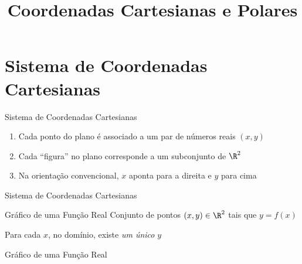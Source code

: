 
\usepackage{calculo_varias_variaveis-1}

\usepackage{tikz}
\usetikzlibrary{angles}

\title {Coordenadas Cartesianas e Polares}



\addtitle

\section{Sistema de Coordenadas Cartesianas}

\begin{frame}{Sistema de Coordenadas Cartesianas}
  \begin{enumerate}[<+->]
    \item Cada ponto do plano é associado a um par de números reais $(x, y)$
    \item Cada ``figura'' no plano corresponde a um subconjunto de $\R^2$
    \item Na orientação convencional, $x$ aponta para a direita e $y$ para cima
  \end{enumerate}
\end{frame}

\begin{frame}{Sistema de Coordenadas Cartesianas}
  \centering
  
\end{frame}

\begin{frame}{Gráfico de uma Função Real}
  Conjunto de pontos $(x, y) \in \R^2$ tais que \(y = f(x)\)

  \pause
  \vspace{\baselineskip}
  Para cada $x$, no domínio, existe \emph{um único} $y$
\end{frame}

\begin{frame}{Gráfico de uma Função Real}
  \centering
  
\end{frame}

